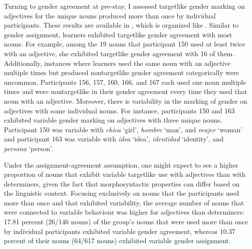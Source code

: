 \documentclass[output=paper,colorlinks,citecolor=brown,modfonts,nonflat]{../langscibook}
\begin{document}
Turning to gender agreement at pre-stay, I assessed targetlike gender marking on adjectives for the unique nouns produced more than once by individual participants. These results are available in , which is organized like . Similar to gender assignment, learners exhibited targetlike gender agreement with most nouns. For example, among the 19 nouns that participant 150 used at least twice with an adjective, she exhibited targetlike gender agreement with 16 of them. Additionally, instances where learners used the same noun with an adjective multiple times but produced nontargetlike gender agreement categorically were uncommon. Participants 156, 157, 160, 166, and 167 each used one noun multiple times and were nontargetlike in their gender agreement every time they used that noun with an adjective. Moreover, there is variability in the marking of gender on adjectives with some individual nouns. For instance, participants 150 and 163 exhibited variable gender marking on adjectives with three unique nouns. Participant 150 was variable with \textit{chica} ‘girl’, \textit{hombre} ‘man’, and \textit{mujer} ‘woman’ and participant 163 was variable with \textit{idea} ‘idea’, \textit{identidad} ‘identity’, and \textit{persona} ‘person’.



Under the assignment-agreement assumption, one might expect to see a higher proportion of nouns that exhibit variable targetlike use with adjectives than with determiners, given the fact that morphosyntactic properties can differ based on the linguistic context. Focusing exclusively on nouns that the participants used more than once and that exhibited variability, the average number of nouns that were connected to variable behaviour was higher for adjectives than determiners: 17.81 percent (26/146 nouns) of the group’s nouns that were used more than once by individual participants exhibited variable gender agreement, whereas 10.37 percent of their nouns (64/617 nouns) exhibited variable gender assignment. 
\end{document}
